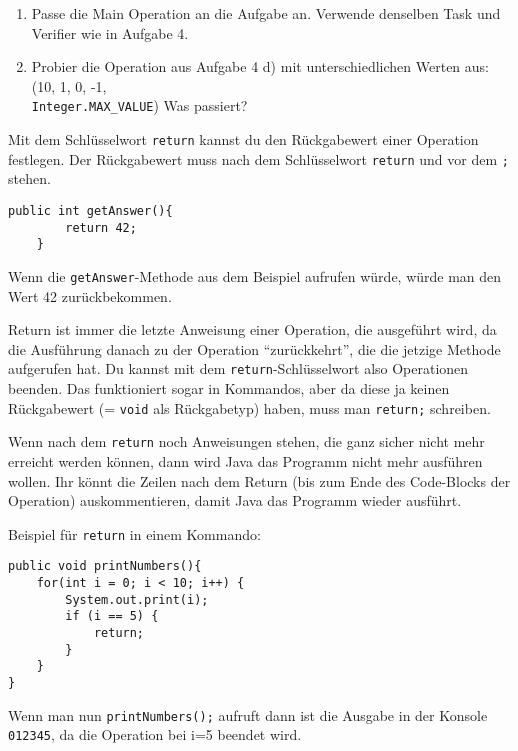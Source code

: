 
\begin{enumerate}
	\item
	Passe die Main Operation an die Aufgabe an.
	Verwende denselben Task und Verifier wie in Aufgabe 4.
	
	\item
	Probier die Operation aus Aufgabe 4 d) mit unterschiedlichen Werten aus: (10, 1, 0, -1, \\\lstinline{Integer.MAX_VALUE})
	Was passiert?
	\end{enumerate}
	
	\begin{Infobox}[Return]
	Mit dem Schlüsselwort \lstinline{return} kannst du den Rückgabewert einer Operation festlegen.
	Der Rückgabewert muss nach dem Schlüsselwort \lstinline{return} und vor dem \lstinline{;} stehen.\newline

	\begin{lstlisting}[xleftmargin=0.5cm]
	public int getAnswer(){
		return 42;
	}
	\end{lstlisting}

	Wenn die \lstinline{getAnswer}-Methode aus dem Beispiel aufrufen würde, würde man den Wert 42 zurückbekommen.\newline

	Return ist immer die letzte Anweisung einer Operation, die ausgeführt wird, da die Ausführung danach zu der Operation \enquote{zurückkehrt}, die die jetzige Methode aufgerufen hat.
	Du kannst mit dem \lstinline{return}-Schlüsselwort also Operationen beenden.
	Das funktioniert sogar in Kommandos, aber da diese ja keinen Rückgabewert (= \lstinline{void} als Rückgabetyp) haben, muss man \lstinline{return;} schreiben.\newline

	Wenn nach dem \lstinline{return} noch Anweisungen stehen, die ganz sicher nicht mehr erreicht werden können, dann wird Java das Programm nicht mehr ausführen wollen.
	Ihr könnt die Zeilen nach dem Return (bis zum Ende des Code-Blocks der Operation) auskommentieren, damit Java das Programm wieder ausführt.\newline

	Beispiel für \lstinline{return} in einem Kommando:

	\begin{lstlisting}[xleftmargin=0.5cm]
public void printNumbers(){
    for(int i = 0; i < 10; i++) {
        System.out.print(i);
        if (i == 5) {
            return;
        }
    }
}
	\end{lstlisting}

	Wenn man nun \lstinline{printNumbers();} aufruft dann ist die Ausgabe in der Konsole \lstinline{012345}, da die Operation bei i=5 beendet wird.
\end{Infobox}

